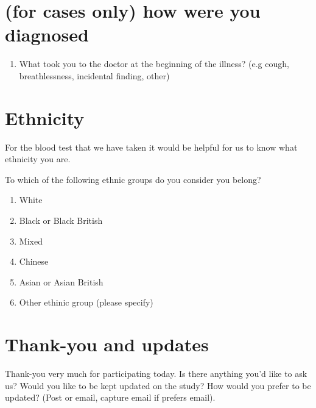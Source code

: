 \documentclass[a4paper,10pt]{article}
\begin{document}
\section{(for cases only) how were you diagnosed}

\begin{enumerate}
    \item What took you to the doctor at the beginning of the illness? (e.g cough, breathlessness, incidental finding, other) 
\end{enumerate}

\section{Ethnicity}
For the blood test that we have taken it would be helpful for us to know what ethnicity you are.

To which of the following ethnic groups do you consider you belong?

\begin{enumerate}
\item White
\item Black or Black British
\item Mixed
\item Chinese
\item Asian or Asian British
\item Other ethinic group (please specify)
\end{enumerate}

\section{Thank-you and updates}
Thank-you very much for participating today. Is there anything you'd like to ask us? Would you like to be kept updated on the study? How would you prefer to be updated? 
(Post or email, capture email if prefers email).

\end{document}

